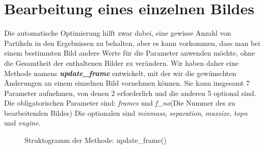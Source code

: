 \section{Bearbeitung eines einzelnen Bildes \label{kap3_bearb_einz_bild}}
Die automatische Optimierung hilft zwar dabei, eine gewisse Anzahl von Partikeln in den Ergebnissen zu behalten, aber es kann vorkommen, dass man bei einem bestimmten Bild andere Werte für die Parameter anwenden möchte, ohne die Gesamtheit der enthaltenen Bilder zu verändern. 
Wir haben daher eine Methode namens \textit{\textbf{update\_frame}} entwickelt, mit der wir die gewünschten Änderungen an einem einzelnen Bild vornehmen können.
Sie kann insgesamt 7 Parameter aufnehmen, von denen 2 erforderlich und die anderen 5 optional sind. Die obligatorischen Parameter sind: \textit{frames} und \textit{f\_no}(Die Nummer des zu bearbeitenden Bildes)
Die optionalen sind \textit{minmass}, \textit{separation}, \textit{maxsize}, \textit{topn} und \textit{engine}.

\begin{figure}[H]
  \centering
  \caption{Struktogramm der Methode: update\_frame()}
  \label{fig:kap3_strukto_update_frame}
\end{figure}

